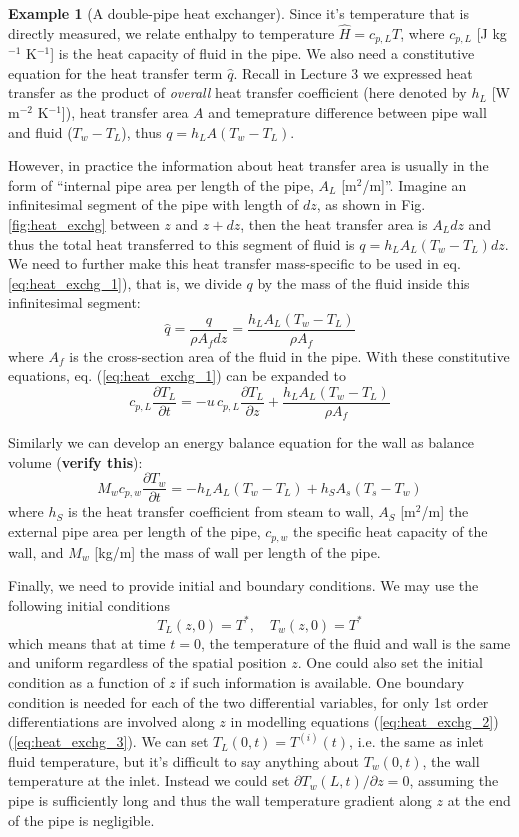 \documentclass[a4paper,11pt]{article}
\theoremstyle{definition}
\newtheorem{exmp}{Example}[section]
\begin{document}
\begin{exmp}[A double-pipe heat exchanger]
\noindent Since it's temperature that is directly measured, we relate enthalpy to temperature $\hat{H} = c_{p,L} T$,
where $c_{p,L}$ [J kg$^{-1}$ K$^{-1}$] is the heat capacity of fluid in the pipe.
We also need a constitutive equation for the heat transfer term $\hat{q}$. 
Recall in Lecture 3 we expressed heat transfer as the product of \emph{overall} heat transfer coefficient
(here denoted by $h_L$ [W m$^{-2}$ K$^{-1}$]), heat transfer area $A$ and temeprature difference between
pipe wall and fluid ($T_w - T_L$), thus $q = h_L A (T_w - T_L)$.

However, in practice the information about heat transfer area is usually in the form of 
``internal pipe area per length of the pipe, $A_L$ [m$^{2}$/m]''. Imagine an infinitesimal segment of the pipe with
length of $dz$, as shown in Fig. \ref{fig:heat_exchg} between $z$ and $z + dz$, then the heat transfer area is
$A_L dz$ and thus the total heat transferred to this segment of fluid is $q = h_L A_L (T_w - T_L) dz$.
We need to further make this heat transfer mass-specific to be used in eq. \ref{eq:heat_exchg_1}), that is,
we divide $q$ by the mass of the fluid inside this infinitesimal segment:
\[ \hat{q} = \frac{q}{\rho A_f dz} = \frac{h_L A_L (T_w - T_L)}{\rho A_f} \]
where $A_f$ is the cross-section area of the fluid in the pipe. With these constitutive equations, 
eq. (\ref{eq:heat_exchg_1}) can be expanded to
\begin{equation} \label{eq:heat_exchg_2}
	c_{p,L} \frac{\partial T_L}{\partial t} = - u \, c_{p,L} \frac{\partial T_L}{\partial z} + \frac{h_L A_L (T_w - T_L)}{\rho A_f}
\end{equation}

Similarly we can develop an energy balance equation for the wall as balance volume (\textbf{verify this}):
\begin{equation} \label{eq:heat_exchg_3}
	M_w c_{p,w} \frac{\partial T_w}{\partial t} = - h_L A_L (T_w - T_L) + h_S A_s (T_s - T_w)
\end{equation}
\noindent where $h_S$ is the heat transfer coefficient from steam to wall, $A_S$ [m$^{2}$/m] the 
external pipe area per length of the pipe, $c_{p,w}$ the specific heat capacity of the wall,
and $M_w$ [kg/m] the mass of wall per length of the pipe.

Finally, we need to provide initial and boundary conditions. We may use the following initial conditions
\[ T_L(z, 0) = T^*, \quad  T_w(z, 0) = T^* \]
which means that at time $t=0$, the temperature of the fluid and wall is the same
and uniform regardless of the spatial position $z$. One could also set the initial condition as a function of $z$
if such information is available.
One boundary condition is needed for each of the two differential variables,
for only 1st order differentiations are involved along $z$ in modelling equations (\ref{eq:heat_exchg_2})(\ref{eq:heat_exchg_3}).
We can set $T_L(0, t) = T^{(i)}(t)$, i.e. the same as inlet fluid temperature,
but it's difficult to say anything about $T_w(0, t)$, the wall temperature at the inlet.
Instead we could set $\partial T_w(L, t) / \partial z = 0$, assuming the pipe is sufficiently
long and thus the wall temperature gradient along $z$ at the end of the pipe is negligible.


\end{exmp}
\end{document}
